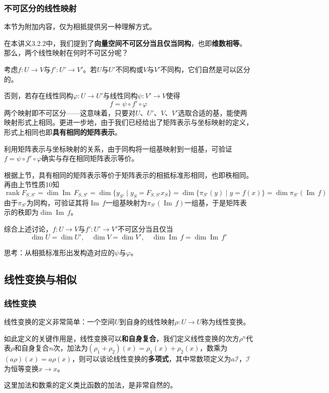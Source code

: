 \documentclass[a4paper,UTF8,fontset=windows]{ctexart}
\DeclareMathOperator{\rank}{rank}
\DeclareMathOperator{\im}{Im\,}
\newcommand*{\mi}{\mathcal{I}}
\newcommand*{\note}{\noindent *}
\begin{document}
\subsubsection{不可区分的线性映射}
\note 本节为附加内容，仅为相抵提供另一种理解方式。

在本讲义3.2.2中，我们提到了\textbf{向量空间不可区分当且仅当同构}，也即\textbf{维数相等}。那么，两个线性映射在何时不可区分呢？

考虑$f:U\to V$与$f':U'\to V'$。若$U$与$U'$不同构或$V$与$V'$不同构，它们自然是可以区分的。

否则，若存在线性同构$\varphi:U\to U'$与线性同构$\psi:V'\to V$使得
$$f=\psi\circ f'\circ\varphi$$
两个映射即不可区分——这意味着，只要对$U$、$U'$、$V$、$V'$选取合适的基，能使两映射形式上相同。更进一步地，由于我们已经给出了矩阵表示与坐标映射的定义，形式上相同也即\textbf{具有相同的矩阵表示}。

\note 利用矩阵表示与坐标映射的关系，由于同构将一组基映射到一组基，可验证$f=\psi\circ f'\circ\varphi$确实与存在相同矩阵表示等价。

根据上节，具有相同的矩阵表示等价于矩阵表示的相抵标准形相同，也即秩相同。再由上节性质10知
$$\rank F_{S,S'}=\dim\im F_{S,S'}=\dim\{y_{S'}\mid y_S=F_{S,S'}x_S\}=\dim\{\pi_{S'}(y)\mid y=f(x)\}=\dim\pi_{S'}(\im f)$$
由于$\pi_{S'}$为同构，可验证其将$\im f$一组基映射为$\pi_{S'}(\im f)$一组基，于是矩阵表示的秩即为$\dim\im f$。

综合上述讨论，$f:U\to V$与$f':U'\to V'$不可区分当且仅当
$$\dim U=\dim U',\quad\dim V=\dim V',\quad\dim\im f=\dim\im f'$$

\note 思考：从相抵标准形出发构造对应的$\psi$与$\varphi$。
\subsection{线性变换与相似}
\subsubsection{线性变换}
线性变换的定义非常简单：一个空间$U$到自身的线性映射$\rho:U\to U$称为线性变换。

如此定义的关键作用是，线性变换可以\textbf{和自身复合}，我们定义线性变换的次方$\rho^n$代表$\rho$和自身复合$n$次，加法为$(\rho_1+\rho_2)(x)=\rho_1(x)+\rho_2(x)$，数乘为$(a\rho)(x)=a\rho(x)$，则可以谈论线性变换的\textbf{多项式}，其中常数项定义为$a\mi$，$\mi$为恒等变换$x\to x$。

\note 这里加法和数乘的定义类比函数的加法，是非常自然的。

\
\end{document}
